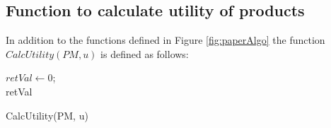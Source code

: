 \subsection{Function to calculate utility of products}
\label{sec:utility}
In addition to the functions defined in Figure \ref{fig:paperAlgo} the function $CalcUtility(PM, u)$ is defined as follows:

\begin{algorithm}[ht]
  \DontPrintSemicolon

  $retVal \gets 0$;\\
  \Return retVal
  \caption{CalcUtility(PM, u)}
  \label{algo:utility}
\end{algorithm}





